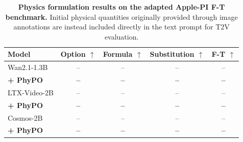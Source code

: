 \documentclass{article}
\begin{document}
\begin{table}[H]
\centering
\small
\setlength{\tabcolsep}{6pt}
\renewcommand{\arraystretch}{1.15}
\begin{tabular}{lcccc}
\toprule
\textbf{Model}
& \textbf{Option} $\uparrow$
& \textbf{Formula} $\uparrow$
& \textbf{Substitution} $\uparrow$
& \textbf{F-T} $\uparrow$ \\
\midrule
Wan2.1-1.3B       & -- & -- & -- & -- \\
\textbf{+ PhyPO}  & \textbf{--} & \textbf{--} & \textbf{--} & \textbf{--} \\
\midrule
LTX-Video-2B      & -- & -- & -- & -- \\
\textbf{+ PhyPO}  & \textbf{--} & \textbf{--} & \textbf{--} & \textbf{--} \\
\midrule
Cosmos-2B         & -- & -- & -- & -- \\
\textbf{+ PhyPO}  & \textbf{--} & \textbf{--} & \textbf{--} & \textbf{--} \\
\bottomrule
\end{tabular}
\caption{\textbf{Physics formulation results on the adapted
Apple-PI F-T benchmark.} Initial physical quantities originally
provided through image annotations are instead included directly
in the text prompt for T2V evaluation.}
\label{tab:apple-pi-ft}
\end{table}


\begin{table}[H]
\centering
\small
\renewcommand{\arraystretch}{1.7}
\setlength{\tabcolsep}{3pt}
\caption{Human evaluation preference win rate (\%) of physical reasoning across video generation models.}
\label{tab:human-physics-eval}
\end{table}
\FloatBarrier
\end{document}

